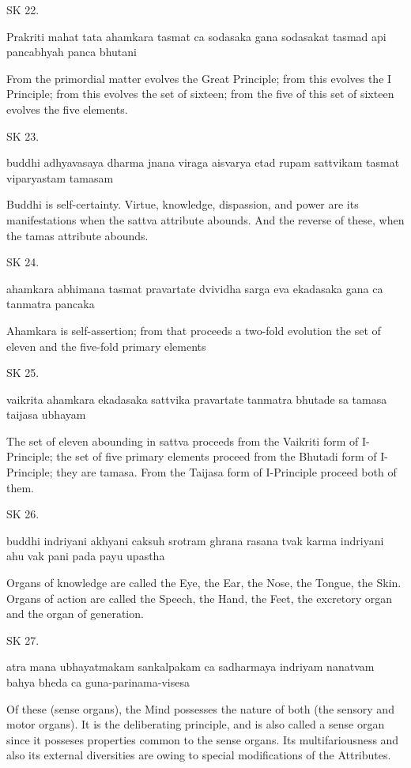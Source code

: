 
SK 22.

Prakriti mahat tata ahamkara tasmat ca sodasaka gana 
sodasakat tasmad api pancabhyah panca bhutani

From the primordial matter evolves the Great Principle;
from this evolves the I Principle;
from this evolves the set of sixteen;
from the five of this set of sixteen evolves the five elements.

SK 23.

buddhi adhyavasaya dharma jnana viraga aisvarya
etad rupam sattvikam tasmat viparyastam tamasam

Buddhi is self-certainty.
Virtue, knowledge, dispassion, and power are its manifestations
when the sattva attribute abounds.
And the reverse of these, when the tamas attribute abounds.

SK 24.

ahamkara abhimana tasmat pravartate dvividha sarga eva
ekadasaka gana ca tanmatra pancaka

Ahamkara is self-assertion;
from that proceeds a two-fold evolution
the set of eleven and the five-fold primary elements

SK 25.

vaikrita ahamkara ekadasaka sattvika pravartate
tanmatra bhutade sa tamasa taijasa ubhayam

The set of eleven abounding in sattva proceeds from the Vaikriti form of I-Principle;
the set of five primary elements proceed from the Bhutadi form of I-Principle; they are tamasa.
From the Taijasa form of I-Principle proceed both of them.

SK 26.

buddhi indriyani akhyani caksuh srotram ghrana rasana tvak 
karma indriyani ahu vak pani pada payu upastha

Organs of knowledge are called the Eye, the Ear, the Nose, the Tongue, the Skin.
Organs of action are called the Speech, the Hand, the Feet, the excretory organ and the organ of generation.

SK 27.

atra mana ubhayatmakam sankalpakam ca sadharmaya indriyam
nanatvam bahya bheda ca guna-parinama-visesa

Of these (sense organs), the Mind possesses the nature of both
(the sensory and motor organs).
It is the deliberating principle, and is also called a sense organ
since it posseses properties common to the sense organs.
Its multifariousness and also its external diversities are owing
to special modifications of the Attributes.


